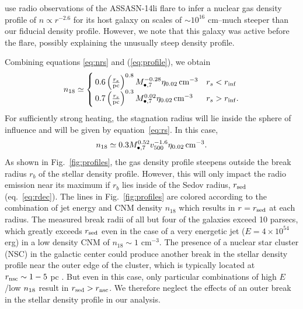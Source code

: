 \documentclass[usenatbib,fleqn]{mnras}
\newcommand{\Mbh}[1][]{M_{\bullet#1}}
\begin{document}
\citet{Alexander+2015} use radio observations of the ASSASN-14li flare
to infer a nuclear gas density profile of $n\propto r^{-2.6}$ for its
host galaxy on scales of $\sim 10^{16}$ cm--much steeper than
our fiducial density profile. However, we note that this galaxy was
active before the flare, possibly explaining the unusually steep
density profile.

Combining equations \eqref{eq:nrs} and (\ref{eq:profile}),
we obtain
\begin{equation}
  n_{18}\simeq
\begin{cases}
 0.6 \left(\frac{r_s}{\rm pc}\right)^{0.8}
  \Mbh[,7]^{-0.28} \eta_{0.02} \, {\rm cm^{-3}} & r_s<r_{\rm inf}\\
 0.7 \left(\frac{r_s}{\rm pc}\right)^{0.3}
  \Mbh[,7]^{0.02} \eta_{0.02} \, {\rm cm^{-3}} & r_s>r_{\rm inf}.
\end{cases}
  \label{eq:n18}
\end{equation}
%
For sufficiently strong heating, the stagnation radius will lie inside
the sphere of influence and will be given by
equation~\eqref{eq:rs}. In this case,
\begin{equation}
  n_{18}\simeq 0.3 \Mbh[,7]^{0.52} v_{500}^{-1.6} \eta_{0.02} \, {\rm
    cm^{-3}}.
\label{eq:n182}
\end{equation} 
%
As shown in Fig.~\ref{fig:profiles}, the gas density profile 
steepens outside the break radius $r_b$ of the stellar density
profile.  However, this will only impact the radio emission near its
maximum if $r_b$ lies inside of the Sedov radius, $r_{\rm sed}$
(eq.~\ref{eq:rdec}).  The lines in Fig.~\ref{fig:profiles} are colored
according to the combination of jet energy and CNM density $n_{18}$
which results in $r = r_{\rm sed}$ at each radius.  The measured break
radii of all but four of the \citet{Lauer+2007} galaxies exceed 10
parsecs, which greatly exceeds $r_{\rm sed}$ even in the case of a
very energetic jet ($E=4\times 10^{54}$ erg) in a low density CNM of
$n_{18} \sim 1$ cm$^{-3}$.  The presence of a nuclear star cluster
(NSC) in the galactic center could produce another break in the
stellar density profile near the outer edge of the cluster, which is
typically located at $r_{\rm nsc} \sim 1-5$ pc \citep{Georgiev+2014}.
But even in this case, only particular combinations of high $E$/low
$n_{\rm 18}$ result in $r_{\rm sed} > r_{\rm nsc}$.  We therefore
neglect the effects of an outer break in the stellar density profile
in our analysis.
\end{document}
